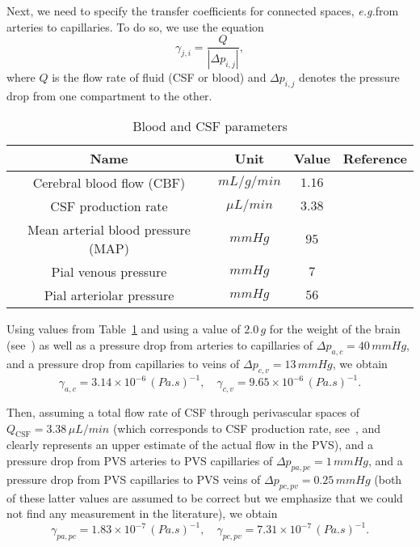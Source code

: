 \documentclass[a4paper,11pt]{article}
\newcommand{\eg}{\emph{e.g.}\;}
\newcommand{\1}{^{(1)}}
\newcommand{\2}{^{(2)}}
\newcommand{\abs}[1]{\left\lvert#1\right\rvert}
\begin{document}
Next, we need to specify the transfer coefficients for connected spaces, \eg from arteries to capillaries. To do so, we use the equation
\[
    \gamma_{j,i} = \frac{Q}{\abs{\Delta p_{i,j}}}, 
\]
where $Q$ is the flow rate of fluid (CSF or blood) and $\Delta p_{i,j}$ denotes the pressure drop from one compartment to the other. 
\begin{table}[!h]
    \centering
    \begin{tabular}{c|c|c|c}
        Name & Unit & Value & Reference \\
        \hline
        Cerebral blood flow (CBF) & $\si{mL/g/min}$ & $1.16$ & \cite{Larkin}\\
        CSF production rate & $\si{\mu L/min}$ & $3.38$ & \cite{CHODOBSKI1998205}\\
        Mean arterial blood pressure (MAP) & $\si{mmHg}$ & $95$ & \cite{dai2016high}\\
        Pial venous pressure & $\si{mmHg}$ & $7$& \cite{mayhan_role_1986} \\
        Pial arteriolar pressure & $\si{mmHg}$ & $56$ & \cite{mayhan_role_1986,Baumbach}\\
    \end{tabular}
    \caption{Blood and CSF parameters}
    \label{tab:bloodparam}
\end{table}
Using values from Table~\ref{tab:bloodparam} and using a value of $2.0\,\si{g}$ for the weight of the brain (see~\cite{piao2013change}) as well as a pressure drop from arteries to capillaries of $\Delta p_{a,c} = 40 \,\si{mmHg}$, and a pressure drop from capillaries to veins of $\Delta p_{c,v} = 13\, \si{mmHg}$, we obtain 
\[
    \gamma_{a,c} = 3.14 \times 10^{-6} \, \si{(Pa.s)^{-1}},\quad \gamma_{c,v} = 9.65  \times 10^{-6}\, \si{(Pa.s)^{-1}}.
\]

Then, assuming a total flow rate of CSF through perivascular spaces of  $Q_\text{CSF} = 3.38 \,\si{\mu L/min}$ (which corresponds to CSF production rate, see~\cite{KARIMY201578}, and clearly represents an upper estimate of the actual flow in the PVS), and a pressure drop from PVS arteries to PVS capillaries of $\Delta p_{pa,pc} = 1 \, \si{mmHg}$, and a  pressure drop from PVS capillaries to PVS veins of $\Delta p_{pc,pv} = 0.25 \, \si{mmHg}$ (both of these latter values are assumed to be correct but we emphasize that we could not find any measurement in the literature), we obtain 
\[
    \gamma_{pa,pc} = 1.83 \times 10^{-7}\, \si{(Pa.s)^{-1}},\quad \gamma_{pc,pv} = 7.31  \times 10^{-7}\, \si{(Pa.s)^{-1}}.
\]
\end{document}
